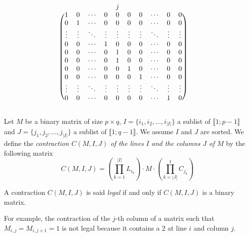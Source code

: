 \begin{definition}
$$\begin{blockarray}{ccccccccccc}
 & & & & j & & & & &\\
\begin{block}{(cccccccccc)c}
1      &  0     & \cdots & 0      & 0 & 0 &  0  & \cdots & 0 & 0 &\\
0      &  1     & \cdots & 0      & 0 & 0 &  0  & \cdots & 0 & 0 &\\
\vdots & \vdots & \ddots & \vdots & \vdots & \vdots &  \vdots  & \ddots & \vdots  & \vdots  &\\
0      &   0    &\cdots  & 1      & 0 & 0 &  0  & \cdots & 0 & 0 &\\ 
0      &   0    &\cdots  & 0      & 1 & 0 &  0  & \cdots & 0 & 0 &\\ 
0      &   0    &\cdots  & 0      & 1 & 0 &  0  & \cdots & 0 & 0 &\\
0      &   0    &\cdots  & 0      & 0 & 1 &  0  & \cdots & 0 & 0 &\\ 
0      &   0    &\cdots  & 0      & 0 & 0  &  1 & \cdots & 0 & 0 &\\
\vdots      &   \vdots    &\ddots  & \vdots     & \vdots & \vdots & \vdots & \ddots & \vdots & \vdots  &\\
0      &   0    &\cdots  & 0      & 0 & 0      &   0    &\cdots  & 1      & 0 &\\
\end{block}
\end{blockarray}
$$
\end{definition}

\begin{definition}
Let $M$ be a binary matrix of size $p \times q$, $I = \{i_1, i_2, \dots, i_{|I|}\}$ a sublist of $\llbracket 1;p-1 \rrbracket$ and $J = \{j_1, j_2, \dots, j_{|I|}\}$ a sublist of $\llbracket 1;q-1 \rrbracket$. We assume $I$ and $J$ are sorted. We define the \emph{contraction $C(M,I,J)$ of the lines $I$ and the columns $J$ of $M$} by the following matrix
$$
C(M,I,J) = \left(\prod\limits_{k = 1}^{|I|} L_{i_k}\right) \cdot M \cdot \left(\prod\limits_{k = |J|}^{1} C_{j_k}\right)
$$
\end{definition}

\begin{definition}
	A contraction $C(M,I,J)$ is said \emph{legal} if and only if $C(M,I,J)$ is a binary matrix.
\end{definition}

For example, the contraction of the $j$-th column of a matrix such that $M_{i,j} = M_{i,j+1} = 1$ is not legal because it contains a $2$ at line $i$ and column $j$.

